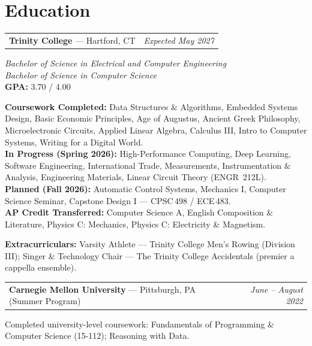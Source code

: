 \documentclass[10pt, letterpaper]{article}
\begin{document}
\section{Education}

\begin{tabularx}{\linewidth}{@{}X r@{}}
  \textbf{Trinity College} \textnormal{---} Hartford, CT & \textit{Expected May 2027}
\end{tabularx}
\vspace{1pt}
\textit{Bachelor of Science in Electrical and Computer Engineering} \\
\textit{Bachelor of Science in Computer Science} \\
\textbf{GPA:} 3.70 / 4.00

\vspace{4pt}
\textbf{Coursework Completed:} Data Structures \& Algorithms, Embedded Systems Design,
Basic Economic Principles, Age of Augustus, Ancient Greek Philosophy, Microelectronic Circuits,
Applied Linear Algebra, Calculus III, Intro to Computer Systems, Writing for a Digital World.\\[2pt]
\textbf{In Progress (Spring 2026):} High-Performance Computing, Deep Learning, Software
Engineering, International Trade, Measurements, Instrumentation \& Analysis, Engineering
Materials, Linear Circuit Theory (ENGR~212L).\\[2pt]
\textbf{Planned (Fall 2026):} Automatic Control Systems, Mechanics I, Computer Science Seminar,
Capstone Design I --- CPSC\,498 / ECE\,483.\\[2pt]
\textbf{AP Credit Transferred:} Computer Science A, English Composition \& Literature,
Physics C: Mechanics, Physics C: Electricity \& Magnetism.

\vspace{4pt}
\textbf{Extracurriculars:} Varsity Athlete --- Trinity College Men's Rowing (Division III);
Singer \& Technology Chair --- The Trinity College Accidentals (premier a cappella ensemble).

\vspace{6pt}

\begin{tabularx}{\linewidth}{@{}X r@{}}
  \textbf{Carnegie Mellon University} \textnormal{---} Pittsburgh, PA (Summer Program) &
  \textit{June -- August 2022}
\end{tabularx}
\vspace{1pt}
Completed university-level coursework: Fundamentals of Programming \& Computer Science (15-112);
Reasoning with Data.
\end{document}
